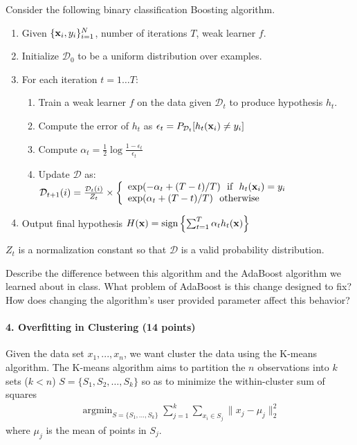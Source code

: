 \documentclass{article}
\newcommand{\vx}{{\bf x}}
\newcommand{\vxi}{{\bf x}_i}
\newcommand{\yi}{y_i}
\newcommand{\D}{\mathcal{D}}
\begin{document}
Consider the following binary classification Boosting algorithm.
\begin{enumerate}
	\item Given $\{\vxi, \yi\}_{i=1}^N$, number of iterations $T$, weak learner $f$.
	\item Initialize $\D_0$ to be a uniform distribution over examples.
	\item For each iteration $t = 1 \ldots T$:
		\begin{enumerate}
			\item Train a weak learner $f$ on the data given $\D_t$ to produce hypothesis $h_t$.
			\item Compute the error of $h_t$ as $\epsilon_t = P_{\D_t} [h_t(\vxi) \ne \yi]$
			\item Compute $\alpha_t = \frac{1}{2} \log \frac{1-\epsilon_t}{\epsilon_t}$
			\item Update $\D$ as:\\
				$\D_{t+1}(i) = \frac{\D_t(i)}{Z_t} \times \left\{
					\begin{array}{lr}
						\exp(-\alpha_t + (T-t) / T) ~~  \textrm{if} ~~ h_t(\vxi) = \yi  \\
						\exp(\alpha_t + (T-t) / T) ~~ \textrm{otherwise}
					\end{array}
					\right.$
		\end{enumerate}
	\item Output final hypothesis $H(\vx)=\textrm{sign} \left\{ \sum_{t=1}^T \alpha_t h_t(\vx) \right\}$
	\end{enumerate}

	$Z_t$ is a normalization constant so that $\D$ is a valid probability distribution.

	Describe the difference between this algorithm and the AdaBoost algorithm we learned about in class. What problem of AdaBoost is this change designed to fix? How does changing the algorithm's user provided parameter affect this behavior?

	\paragraph{4. Overfitting in Clustering (14 points)}

	Given the data set $x_1,...,x_n$, we want cluster the data using the K-means algorithm. The K-means algorithm aims to partition the $n$ observations into $k$ sets ($k < n$) $S = \{S_1, S_2, \ldots, S_k\}$ so as to minimize the within-cluster sum of squares
	\begin{eqnarray}
		\mathop{\textrm{argmin}}_{S=\{S_1,...,S_k\}}\sum_{j=1}^k\sum_{x_i\in S_j}\|x_j-\mu_j\|_2^2
		\label{objective1}
	\end{eqnarray}
	where $\mu_j$ is the mean of points in $S_j$.
\end{document}
